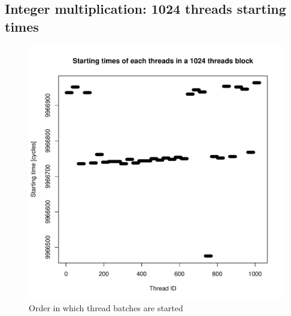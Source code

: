 \documentclass{article}
\begin{document}
	\subsection{Integer multiplication: 1024 threads starting times}
    \begin{figure}[h]
	    \includegraphics[width=\linewidth]{"graphics/starting_times_ratio31"}
	    \caption{Order in which thread batches are started}
    \end{figure}
    \pagebreak
\end{document}
